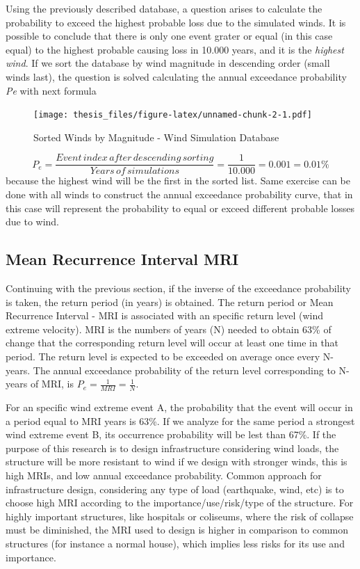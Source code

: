 \documentclass[12pt,oneside]{reedthesis}
\begin{document}
Using the previously described database, a question arises to calculate the probability to exceed the highest probable loss due to the simulated winds. It is possible to conclude that there is only one event grater or equal (in this case equal) to the highest probable causing loss in 10.000 years, and it is the \emph{highest wind}. If we sort the database by wind magnitude in descending order (small winds last), the question is solved calculating the annual exceedance probability \emph{Pe} with next formula

\footnotesize
\begin{figure}
\centering
\texttt{[image: thesis\_files/figure-latex/unnamed-chunk-2-1.pdf]}
\caption{\label{fig:unnamed-chunk-2}Sorted Winds by Magnitude - Wind Simulation Database}
\end{figure}
\normalsize

\[
P_e = \frac{Event\,index\,after\,descending\,sorting}{Years\,of\,simulations } = \frac{1}{10.000}=0.001=0.01\%
\]
because the highest wind will be the first in the sorted list. Same exercise can be done with all winds to construct the annual exceedance probability curve, that in this case will represent the probability to equal or exceed different probable losses due to wind.

\hypertarget{mean-recurrence-interval-mri}{%
\subsection{Mean Recurrence Interval MRI}\label{mean-recurrence-interval-mri}}

Continuing with the previous section, if the inverse of the exceedance probability is taken, the return period (in years) is obtained. The return period or Mean Recurrence Interval - MRI is associated with an specific return level (wind extreme velocity). MRI is the numbers of years (N) needed to obtain 63\% of change that the corresponding return level will occur at least one time in that period. The return level is expected to be exceeded on average once every N-years. The annual exceedance probability of the return level corresponding to N-years of MRI, is \(P_e=\frac{1}{MRI}=\frac{1}{N}\).

For an specific wind extreme event A, the probability that the event will occur in a period equal to MRI years is 63\%. If we analyze for the same period a strongest wind extreme event B, its occurrence probability will be lest than 67\%. If the purpose of this research is to design infrastructure considering wind loads, the structure will be more resistant to wind if we design with stronger winds, this is high MRIs, and low annual exceedance probability. Common approach for infrastructure design, considering any type of load (earthquake, wind, etc) is to choose high MRI according to the importance/use/risk/type of the structure. For highly important structures, like hospitals or coliseums, where the risk of collapse must be diminished, the MRI used to design is higher in comparison to common structures (for instance a normal house), which implies less risks for its use and importance.
\end{document}

